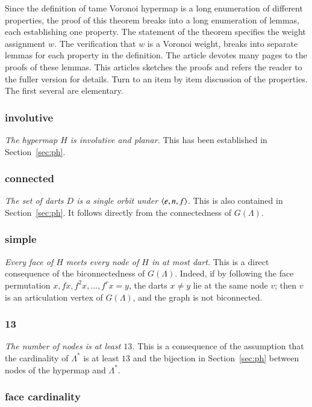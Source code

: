 Since the definition of tame Voronoi hypermap is a long enumeration of different properties,
the proof of this theorem breaks into a long enumeration of lemmas, each establishing
one property.  The statement of the theorem specifies the weight assignment $w$.  The
verification that $w$ is a Voronoi weight, breaks into separate lemmas for each property in the definition.  The article \cite{arx} devotes
many pages to the proofs of these lemmas.  This articles sketches the proofs and
refers the reader to the fuller version for details.
Turn to an item by item discussion of the properties.  The first several
are elementary.

\subsubsection{involutive}
{\it The hypermap $H$ is involutive and planar.}  This has been established in Section~\ref{sec:ph}.


\subsubsection{connected}
{\it The set of darts $D$  is a single orbit under $\langle e,n,f\rangle$.}  This is also
contained in Section~\ref{sec:ph}. It follows directly from the
connectedness of $G(\Lambda)$.

\subsubsection{simple}

{\it Every face of $H$ meets every node of $H$ in at most
dart.}  This is a direct consequence of the biconnectedness of $G(\Lambda)$.
Indeed, if by following the face permutation $x,f x, f^2 x,\ldots, f^r x= y$,
the darts $x\ne y$ lie at the same node $v$; then $v$ is an articulation vertex
of $G(\Lambda)$, and the graph is not biconnected.

\subsubsection{13}

{\it The number of nodes is at least $13$.}  This is a consequence of the assumption
that the cardinality of $\Lambda^*$ is at least $13$ and the bijection in
Section~\ref{sec:ph} between nodes of the hypermap and $\Lambda^*$.

\subsubsection{face cardinality}\label{sec:face}

